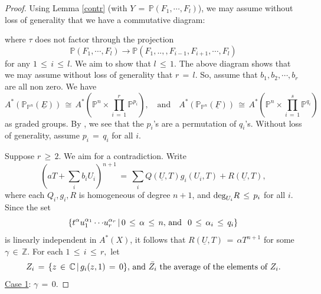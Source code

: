 \documentclass[12pt,reqno]{amsart}
\theoremstyle{definition}
\numberwithin{equation}{section}
\begin{document}
\begin{proof}
Using Lemma \ref{contr} (with $Y\,=\,\mathbb{P}(F_{1},\cdots, F_{l})$), we may assume without loss of generality that we have a commutative diagram: 

\begin{center}
\end{center}
where $\tau$ does not factor through the projection 
\begin{equation*}
\mathbb{P}(F_{1},\cdots,F_{l})\to \mathbb{P}(F_{1},..,,F_{i-1},F_{i+1},\cdots,F_{l})
\end{equation*}
for any $1\,\leq\, i\, \leq \,l.$
We aim to show that $l\,\leq\, 1$. The above diagram shows that we may assume without loss of generality that $r\,=\,l$. So, assume that $b_{1},b_{2},\cdots ,b_{r}$ are all non zero. 
We have 
\begin{equation*}
A^{\ast}(\mathbb{P}_{\mathbb{P}^{n}}(\underline{E}))\,\cong\, A^{\ast}( \mathbb{P}^{n}\times\prod_{i\,=\,1}^{r}\mathbb{P}^{p_{i}}), \quad\textrm{and}\quad A^{\ast}(\mathbb{P}_{\mathbb{P}^{n}}(\underline{F}))\,\cong\, A^{\ast}(\mathbb{P}^{n}\times\prod_{i\,=\,1}^{s}\mathbb{P}^{q_{i}} ) 
 \end{equation*}
 as graded groups. By {\cite[Lemma 4.1]{BSV1}}, we see that the $p_i$'s are a permutation of $q_i$'s. Without loss of generality, assume $p_i\,=\,q_i$ for all $i$. 

Suppose $r\,\geq \,2$. We aim for a contradiction. Write 
$$ (aT+\sum_{i}b_{i}U_{i})^{n+1} \,=\, \sum_{i}Q(\underline{U},T)g_{i}(U_{i},T) + R(\underline{U},T),$$ where each
$Q_{i},g_{i},R$ is homogeneous of degree $n+1$, and $ \textnormal{deg}_{U_{i}} R\, \leq\, p_{i}$ for all $i.$
Since the set
\begin{equation*}
\{t^{\alpha }{u_{1}^{\alpha_{1}}\cdots}u_{r}^{\alpha_{r}}\,|\,  0\,\leq\, \alpha\,\leq\, n,\, \textnormal{and} \,\ \medspace 0\,\leq\,\alpha_{i}\,\leq\, q_{i}\} 
\end{equation*}
is linearly independent in $A^*(X)$, it follows that $ R(\underline{U},T)\,=\, \alpha T^{n+1}$ for some $ \gamma \,\in\, \mathbb{Z}$. For each $1\,\leq\, i\, \leq\, r,$ let
\begin{equation*}
Z_i\,=\,\{z\,\in\, \mathbb{C}\,|\, g_i(z,1)\,=\,0\},  \, \text{and}\, \, \Bar{Z_i}\,\,  \text{the average of the elements of } Z_i.
\end{equation*}
\underline{Case 1}: $ \gamma \,=\,0.$


\end{proof}
\end{document}
